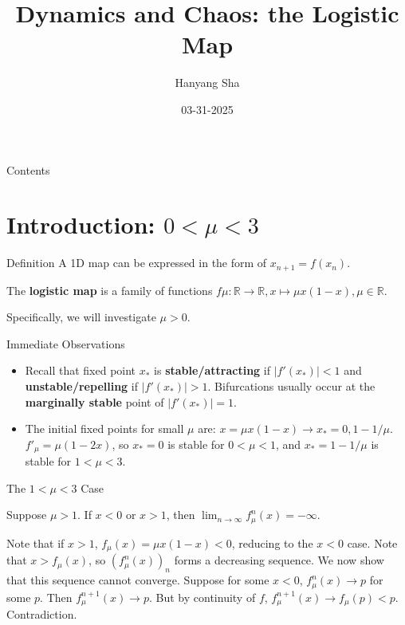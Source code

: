 \documentclass[aspectratio=169]{beamer}
\title{Dynamics and Chaos: the Logistic Map}
\author{Hanyang Sha}
\date{03-31-2025}
\begin{document}
\begin{frame}
\titlepage
\end{frame}

\begin{frame}{Contents}
\tableofcontents
\end{frame}

\section{Introduction: $0<\mu<3$}
\frame{\sectionpage}

\begin{frame}{Definition}
    A 1D map can be expressed in the form of $x_{n+1} = f(x_n)$. 
    \begin{defn}
        The \textbf{logistic map} is a family of functions $f\mu: \mathbb{R}\rightarrow \mathbb{R}, x \mapsto \mu x(1-x),\mu\in\mathbb{R}$.
    \end{defn}
    Specifically, we will investigate $\mu>0$.
\end{frame}

\begin{frame}{Immediate Observations}
\begin{itemize}
    \item Recall that fixed point $x_*$ is \textbf{stable/attracting} if $\lvert f'(x_*) \rvert < 1$ and \textbf{unstable/repelling} if $\lvert f'(x_*) \rvert > 1$. Bifurcations usually occur at the \textbf{marginally stable} point of $\lvert f'(x_*) \rvert = 1$. 
    \item The initial fixed points for small $\mu$ are: $x = \mu x(1-x) \rightarrow x_* = 0, 1-1/\mu$. $f'_\mu = \mu(1-2x)$, so $x_* = 0$ is stable for $0 < \mu < 1$, and $x_* = 1-1/\mu$ is stable for $1 < \mu < 3$.
\end{itemize}
\end{frame}

\begin{frame}{The $1<\mu<3$ Case}
\begin{prop}
    Suppose $\mu> 1$. If $x < 0$ or $x > 1$, then $\displaystyle\lim_{n\rightarrow\infty} f_\mu^n(x) = -\infty$. 
\end{prop}
\begin{pf}
    Note that if $x>1$, $f_\mu(x) = \mu x(1-x) < 0$, reducing to the $x<0$ case. Note that $x > f_\mu(x)$, so $(f_\mu^n(x))_n$ forms a decreasing sequence. We now show that this sequence cannot converge. Suppose for some $x<0$, $f_\mu^n(x)\rightarrow p$ for some $p$. Then $f_\mu^{n+1}(x) \rightarrow p$. But by continuity of $f$, $f_\mu^{n+1}(x) \rightarrow f_\mu(p) < p$. Contradiction. 
\end{pf}
\end{frame}
\end{document}
